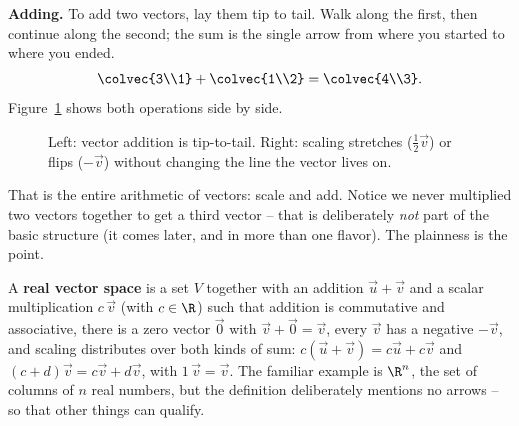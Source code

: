 \textbf{Adding.} To add two vectors, lay them tip to tail. Walk along the first, then continue along
the second; the sum is the single arrow from where you started to where you ended.
\[
\colvec{3\\1} + \colvec{1\\2} = \colvec{4\\3}.
\]
Figure~\ref{ch01:addscale} shows both operations side by side.

\begin{figure}[H]
\centering
{}
\caption{Left: vector addition is tip-to-tail. Right: scaling stretches ($\tfrac12\vec v$) or flips
($-\vec v$) without changing the line the vector lives on.}
\label{ch01:addscale}
\end{figure}

That is the entire arithmetic of vectors: scale and add. Notice we never multiplied two vectors
together to get a third vector -- that is deliberately \emph{not} part of the basic structure (it
comes later, and in more than one flavor). The plainness is the point.

\begin{formalbox}
A \textbf{real vector space} is a set $V$ together with an addition $\vec u + \vec v$ and a scalar
multiplication $c\,\vec v$ (with $c\in\R$) such that addition is commutative and associative, there is
a zero vector $\vec 0$ with $\vec v + \vec 0 = \vec v$, every $\vec v$ has a negative $-\vec v$, and
scaling distributes over both kinds of sum: $c(\vec u+\vec v)=c\vec u + c\vec v$ and
$(c+d)\vec v = c\vec v + d\vec v$, with $1\,\vec v = \vec v$. The familiar example is
$\R^n$, the set of columns of $n$ real numbers, but the definition deliberately mentions no arrows --
so that other things can qualify.
\end{formalbox}

